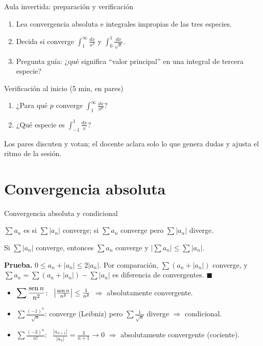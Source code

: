 \documentclass[10pt,aspectratio=169]{beamer}
\begin{document}
\begin{frame}{Aula invertida: preparación y verificación}
  \small
  \begin{previa}
    \begin{enumerate}
      \item Lea convergencia absoluta e integrales impropias de las tres especies.
      \item Decida si converge $\int_1^\infty\frac{dx}{x^2}$ y $\int_0^1\frac{dx}{\sqrt x}$.
      \item Pregunta guía: ¿qué significa ``valor principal'' en una integral de tercera especie?
    \end{enumerate}
  \end{previa}
  \begin{block}{Verificación al inicio (5 min, en pares)}
    \begin{enumerate}
      \item ¿Para qué $p$ converge $\int_1^\infty\frac{dx}{x^p}$?
      \item ¿Qué especie es $\int_{-1}^1\frac{dx}{x}$?
    \end{enumerate}
    Los pares discuten y votan; el docente aclara solo lo que genera dudas y ajusta el ritmo de la sesión.
  \end{block}
\end{frame}

\section{Convergencia absoluta}

\begin{frame}{Convergencia absoluta y condicional}
  \begin{definicion}
    $\sum a_n$ es  si $\sum|a_n|$ converge; 
    si $\sum a_n$ converge pero $\sum|a_n|$ diverge.
  \end{definicion}
  \begin{teorema}
    Si $\sum|a_n|$ converge, entonces $\sum a_n$ converge y $\left|\sum a_n\right|\le\sum|a_n|$.
  \end{teorema}
  \textbf{Prueba.} $0\le a_n+|a_n|\le2|a_n|$. Por comparación, $\sum(a_n+|a_n|)$ converge, y
  $\sum a_n=\sum(a_n+|a_n|)-\sum|a_n|$ es diferencia de convergentes. $\blacksquare$
  \begin{ejemplo}
    \begin{itemize}
      \item $\displaystyle\sum\frac{\operatorname{sen} n}{n^2}$: \ $\left|\frac{\operatorname{sen} n}{n^2}\right|\le\frac1{n^2}$ $\Rightarrow$ absolutamente convergente.
      \item $\displaystyle\sum\frac{(-1)^n}{\sqrt n}$: converge (Leibniz) pero $\sum\frac1{\sqrt n}$ diverge $\Rightarrow$ condicional.
      \item $\displaystyle\sum\frac{(-3)^n}{n!}$: \ $\frac{|a_{n+1}|}{|a_n|}=\frac{3}{n+1}\to0$ $\Rightarrow$ absolutamente convergente (cociente).
    \end{itemize}
  \end{ejemplo}
\end{frame}
\end{document}
